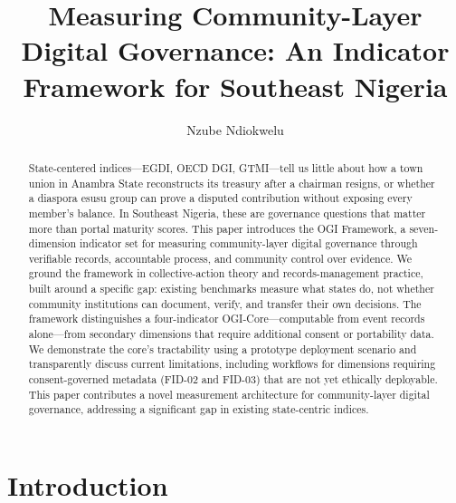 \documentclass[sigconf]{acmart}
\begin{document}
\title{Measuring Community-Layer Digital Governance: An Indicator Framework for Southeast Nigeria}

\author{Nzube Ndiokwelu}

\begin{abstract}
State-centered indices---EGDI, OECD DGI, GTMI---tell us little about how a town union in Anambra State reconstructs its treasury after a chairman resigns, or whether a diaspora esusu group can prove a disputed contribution without exposing every member's balance. In Southeast Nigeria, these are governance questions that matter more than portal maturity scores. This paper introduces the OGI Framework, a seven-dimension indicator set for measuring community-layer digital governance through verifiable records, accountable process, and community control over evidence. We ground the framework in collective-action theory and records-management practice, built around a specific gap: existing benchmarks measure what states do, not whether community institutions can document, verify, and transfer their own decisions. The framework distinguishes a four-indicator OGI-Core---computable from event records alone---from secondary dimensions that require additional consent or portability data. We demonstrate the core's tractability using a prototype deployment scenario and transparently discuss current limitations, including workflows for dimensions requiring consent-governed metadata (FID-02 and FID-03) that are not yet ethically deployable. This paper contributes a novel measurement architecture for community-layer digital governance, addressing a significant gap in existing state-centric indices.
\end{abstract}



\maketitle

\section{Introduction}
\end{document}

